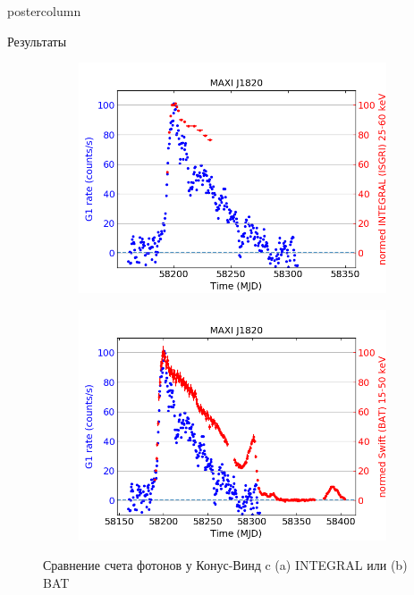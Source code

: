 \documentclass{beamer}
\begin{document}
\begin{frame}
\begin{columns}
\begin{column}{.57\textwidth}
\begin{beamercolorbox}[center]{postercolumn}
\begin{minipage}{.98\textwidth}
{\begin{myblock}{Результаты}
						\begin{figure}[h!]
							\begin{subfigure}[b]{0.45\textwidth}
								\centering
								\includegraphics[width=\textwidth]{pictures/MAXIJ1820_kwG1_int.png}
								\caption{}
							\end{subfigure}
							\begin{subfigure}[b]{0.45\textwidth}
								\centering
								\includegraphics[width=\textwidth]{pictures/MAXIJ1820_kwG1_bat.png}
								\caption{}				
							\end{subfigure}
							\caption{Сравнение счета фотонов у Конус-Винд c (a) INTEGRAL или (b) BAT}
						\end{figure}
						

\end{myblock}}
\end{minipage}
\end{beamercolorbox}
\end{column}
\end{columns}
\end{frame}
\end{document}
